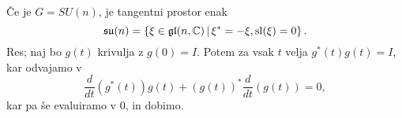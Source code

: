 \begin{primer}
  Če je $G = SU(n)$, je tangentni prostor enak
  \[
	\mathfrak{su}(n) = \left\{ \xi \in \mathfrak{gl}(n, \mathbb{C}) \,|\, \xi^* = -\xi,
	  \operatorname{sl}(\xi) = 0 \right\}.
  \]
  Res; naj bo $g(t)$ krivulja z $g(0) = I$.
  Potem za vsak $t$ velja $g^*(t)g(t) = I$, kar odvajamo v
  \[
	\frac{d}{dt}(g^*(t)) g(t) + (g(t))^* \frac{d}{dt} (g(t)) = 0,
  \]
  kar pa še evaluiramo v $0$, in dobimo.
\end{primer}

